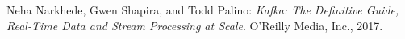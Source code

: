 
\begin{thebibliography}{x}

Neha Narkhede, Gwen Shapira, and Todd Palino: \emph{Kafka: The Definitive Guide, Real-Time Data and Stream Processing at Scale}. O'Reilly Media, Inc., 2017.


\end{thebibliography}